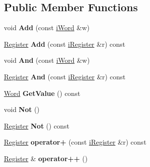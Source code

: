\subsection*{Public Member Functions}
\begin{DoxyCompactItemize}
\item 
\hypertarget{classRegister_a73d8564754d7ddb7e8349001010e688b}{
void {\bfseries Add} (const \hyperlink{classiWord}{iWord} \&w)}
\label{classRegister_a73d8564754d7ddb7e8349001010e688b}

\item 
\hypertarget{classRegister_a9d9c6801db55e8706eb242b1e0e0fa3f}{
\hyperlink{classRegister}{Register} {\bfseries Add} (const \hyperlink{classiRegister}{iRegister} \&r) const }
\label{classRegister_a9d9c6801db55e8706eb242b1e0e0fa3f}

\item 
\hypertarget{classRegister_a312263efb06ef459409879f5119b3b81}{
void {\bfseries And} (const \hyperlink{classiWord}{iWord} \&w)}
\label{classRegister_a312263efb06ef459409879f5119b3b81}

\item 
\hypertarget{classRegister_af3502239502c214b8c9362a6fd9f8ff8}{
\hyperlink{classRegister}{Register} {\bfseries And} (const \hyperlink{classiRegister}{iRegister} \&r) const }
\label{classRegister_af3502239502c214b8c9362a6fd9f8ff8}

\item 
\hypertarget{classRegister_a379734c28ab8258ce528a96de24cfa1a}{
\hyperlink{classWord}{Word} {\bfseries GetValue} () const }
\label{classRegister_a379734c28ab8258ce528a96de24cfa1a}

\item 
\hypertarget{classRegister_abbf5f6793328db8b28845cac84c0e82d}{
void {\bfseries Not} ()}
\label{classRegister_abbf5f6793328db8b28845cac84c0e82d}

\item 
\hypertarget{classRegister_a387bb50d01b47071c366708ea10ebdf0}{
\hyperlink{classRegister}{Register} {\bfseries Not} () const }
\label{classRegister_a387bb50d01b47071c366708ea10ebdf0}

\item 
\hypertarget{classRegister_a55de0c3b5f8fe14df7c24bce777204e0}{
\hyperlink{classRegister}{Register} {\bfseries operator+} (const \hyperlink{classiRegister}{iRegister} \&r) const }
\label{classRegister_a55de0c3b5f8fe14df7c24bce777204e0}

\item 
\hypertarget{classRegister_ac4e78cff131bc5c69695a9db5ca35255}{
\hyperlink{classRegister}{Register} \& {\bfseries operator++} ()}
\label{classRegister_ac4e78cff131bc5c69695a9db5ca35255}


\end{DoxyCompactItemize}

